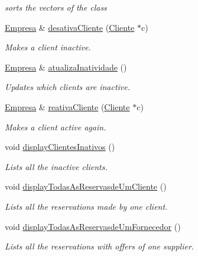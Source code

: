 \begin{DoxyCompactItemize}
\begin{DoxyCompactList}\small\item\em sorts the vectors of the class \end{DoxyCompactList}\item 
\hyperlink{classEmpresa}{Empresa} \& \hyperlink{classEmpresa_a4c8205b2c4aad43f46172966aaed30b7}{desativa\+Cliente} (\hyperlink{classCliente}{Cliente} $\ast$c)
\begin{DoxyCompactList}\small\item\em Makes a client inactive. \end{DoxyCompactList}\item 
\hyperlink{classEmpresa}{Empresa} \& \hyperlink{classEmpresa_aea372dbf680408d9fb32341c03b3e5ad}{atualiza\+Inatividade} ()
\begin{DoxyCompactList}\small\item\em Updates which clients are inactive. \end{DoxyCompactList}\item 
\hyperlink{classEmpresa}{Empresa} \& \hyperlink{classEmpresa_a64b9a495ca3a80380646814557be4924}{reativa\+Cliente} (\hyperlink{classCliente}{Cliente} $\ast$c)
\begin{DoxyCompactList}\small\item\em Makes a client active again. \end{DoxyCompactList}\item 
void \hyperlink{classEmpresa_ac7ea4de24979f6623ffe8fbd3d0eeb24}{display\+Clientes\+Inativos} ()
\begin{DoxyCompactList}\small\item\em Lists all the inactive clients. \end{DoxyCompactList}\item 
void \hyperlink{classEmpresa_a259bb6b172011429c6e24feb0285e66b}{display\+Todas\+As\+Reservasde\+Um\+Cliente} ()
\begin{DoxyCompactList}\small\item\em Lists all the reservations made by one client. \end{DoxyCompactList}\item 
void \hyperlink{classEmpresa_af197726a3dc20739aac877ac4c090f6e}{display\+Todas\+As\+Reservasde\+Um\+Fornecedor} ()
\begin{DoxyCompactList}\small\item\em Lists all the reservations with offers of one supplier. \end{DoxyCompactList}\item 

\end{DoxyCompactItemize}
